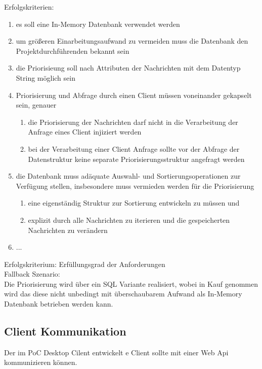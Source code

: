 \documentclass[11pt,oneside,a4paper,notitlepage]{article}
\begin{document}
Erfolgskriterien:
\begin{enumerate}
\item es soll eine In-Memory Datenbank verwendet werden
\item um größeren Einarbeitungsaufwand zu vermeiden muss die Datenbank den Projektdurchführenden bekannt sein
\item die Priorisieung soll nach Attributen der Nachrichten mit dem Datentyp String möglich sein
\item Priorisierung und Abfrage durch einen Client müssen voneinander gekapselt sein, genauer
\begin{enumerate}
\item die Priorisierung der Nachrichten darf nicht in die Verarbeitung der Anfrage eines Client injiziert werden
\item bei der Verarbeitung einer Client Anfrage sollte vor der Abfrage der Datenstruktur keine separate Priorisierungsstruktur angefragt werden
\end{enumerate}
\item die Datenbank muss adäquate Auswahl- und Sortierungsoperationen zur Verfügung stellen, insbesondere muss vermieden werden für die Priorisierung 
\begin{enumerate}
\item eine eigenständig Struktur zur Sortierung entwickeln zu müssen und
\item explizit durch alle Nachrichten zu iterieren und die gespeicherten Nachrichten zu verändern
\end{enumerate}
\item ...
\end{enumerate}
\noindent

Erfolgskriterium: Erfüllungsgrad der Anforderungen\\
%
Fallback Szenario:\\
Die Priorisierung wird über ein SQL Variante realisiert, wobei in Kauf genommen wird das diese nicht unbedingt mit überschaubarem Aufwand als 
In-Memory Datenbank betrieben werden kann.

 
%
%
\subsection{Client Kommunikation}

Der im PoC Desktop Cilent entwickelt e Client sollte mit einer Web Api kommunizieren können.
\end{document}
